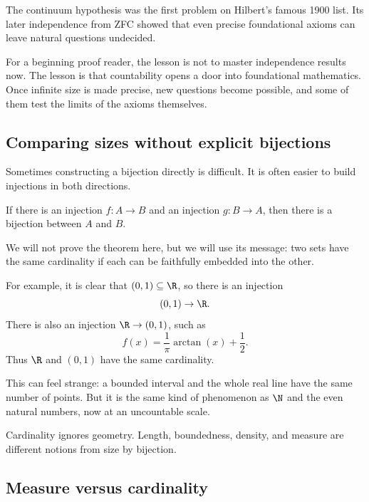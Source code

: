 \begin{historybox}
The continuum hypothesis was the first problem on Hilbert's famous 1900 list. Its later independence from ZFC showed that even precise foundational axioms can leave natural questions undecided.
\end{historybox}

For a beginning proof reader, the lesson is not to master independence results now. The lesson is that countability opens a door into foundational mathematics. Once infinite size is made precise, new questions become possible, and some of them test the limits of the axioms themselves.

\subsection{Comparing sizes without explicit bijections}

Sometimes constructing a bijection directly is difficult. It is often easier to build injections in both directions.

\begin{theorem}
If there is an injection $f:A\to B$ and an injection $g:B\to A$, then there is a bijection between $A$ and $B$.
\end{theorem}

We will not prove the theorem here, but we will use its message: two sets have the same cardinality if each can be faithfully embedded into the other.

For example, it is clear that $(0,1)\subseteq\R$, so there is an injection
\[
(0,1)\to\R.
\]
There is also an injection $\R\to(0,1)$, such as
\[
f(x)=\frac{1}{\pi}\arctan(x)+\frac12.
\]
Thus $\R$ and $(0,1)$ have the same cardinality.

This can feel strange: a bounded interval and the whole real line have the same number of points. But it is the same kind of phenomenon as $\N$ and the even natural numbers, now at an uncountable scale.

\begin{intuitionbox}
Cardinality ignores geometry. Length, boundedness, density, and measure are different notions from size by bijection.
\end{intuitionbox}

\subsection{Measure versus cardinality}

